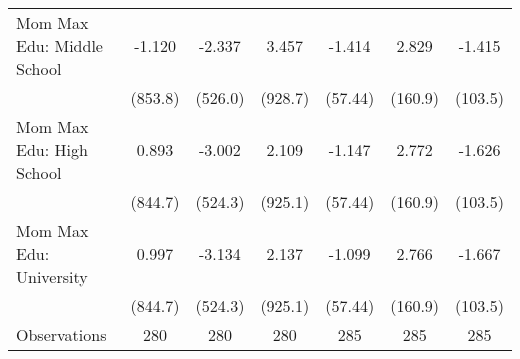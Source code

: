 {\begin{tabular}{l*{6}{c}}
\addlinespace
Mom Max Edu: Middle School&      -1.120         &      -2.337         &       3.457         &      -1.414         &       2.829         &      -1.415         \\
                    &     (853.8)         &     (526.0)         &     (928.7)         &     (57.44)         &     (160.9)         &     (103.5)         \\
\addlinespace
Mom Max Edu: High School&       0.893         &      -3.002         &       2.109         &      -1.147         &       2.772         &      -1.626         \\
                    &     (844.7)         &     (524.3)         &     (925.1)         &     (57.44)         &     (160.9)         &     (103.5)         \\
\addlinespace
Mom Max Edu: University&       0.997         &      -3.134         &       2.137         &      -1.099         &       2.766         &      -1.667         \\
                    &     (844.7)         &     (524.3)         &     (925.1)         &     (57.44)         &     (160.9)         &     (103.5)         \\
\midrule
Observations        &         280         &         280         &         280         &         285         &         285         &         285         \\
\bottomrule
\end{tabular}
}
